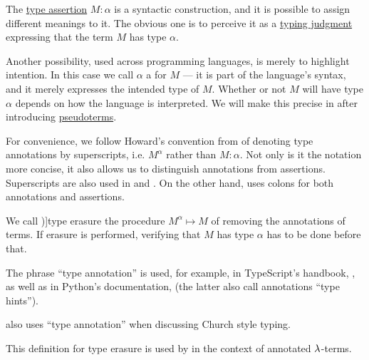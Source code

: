 \begin{concept}\label{con:type_annotation}
  The \hyperref[def:type_assertion]{type assertion} \( M: \alpha \) is a syntactic construction, and it is possible to assign different meanings to it. The obvious one is to perceive it as a \hyperref[rem:typing_judgments]{typing judgment} expressing that the term \( M \) has type \( \alpha \).

  Another possibility, used across programming languages, is merely to highlight intention. In this case we call \( \alpha \) a  for \( M \) --- it is part of the language's syntax, and it merely expresses the intended type of \( M \). Whether or not \( M \) will have type \( \alpha \) depends on how the language is interpreted. We will make this precise in  after introducing \hyperref[def:pseudoterm]{pseudoterms}.

  For convenience, we follow Howard's convention from \cite{Howard1980FormulasAsTypes} of denoting type annotations by superscripts, i.e. \( M^\alpha \) rather than \( M: \alpha \). Not only is it the notation more concise, it also allows us to distinguish annotations from assertions. Superscripts are also used in \cite{Mimram2020Types} and \cite[ch. 5]{Hindley1997STT}. On the other hand,  uses colons for both annotations and assertions.

  We call \term[en=type-erasure (\cite[def. 5A2]{Hindley1997STT})]{type erasure} the procedure \( M^\alpha \mapsto M \) of removing the annotations of terms. If erasure is performed, verifying that \( M \) has type \( \alpha \) has to be done before that.
\end{concept}
\begin{comments}
  \item The phrase \enquote{type annotation} is used, for example, in TypeScript's handbook, \cite{TypeScript:5.7:handbook}, as well as in Python's documentation, \cite{PythonDocs:3.13:typing} (the latter also call annotations \enquote{type hints}).

   also uses \enquote{type annotation} when discussing Church style typing.

  \item This definition for type erasure is used by  in the context of annotated \( \mathrm{\lambda} \)-terms.
\end{comments}


